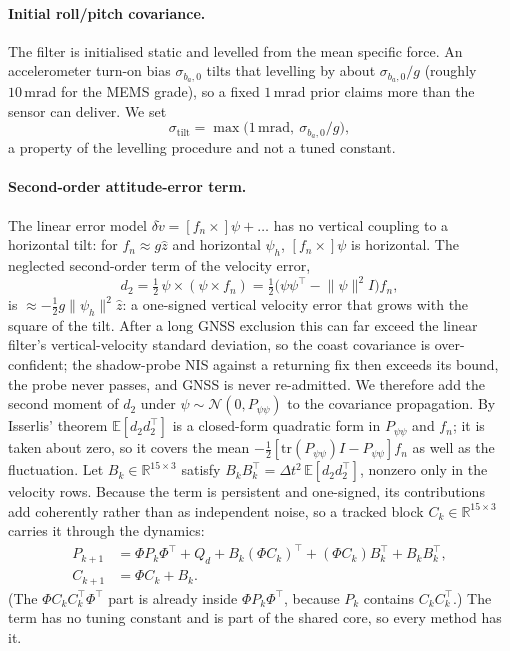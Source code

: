 \documentclass[journal]{IEEEtran}
\begin{document}
\paragraph{Initial roll/pitch covariance.}
The filter is initialised static and levelled from the mean specific force. An accelerometer turn-on bias
$\sigma_{b_a,0}$ tilts that levelling by about $\sigma_{b_a,0}/g$ (roughly $10\,\mathrm{mrad}$ for the MEMS grade), so a fixed
$1\,\mathrm{mrad}$ prior claims more than the sensor can deliver. We set
\begin{equation}
\sigma_{\mathrm{tilt}} = \max\!\big(1\,\mathrm{mrad},\ \sigma_{b_a,0}/g\big),
\label{eq:tilt0}
\end{equation}
a property of the levelling procedure and not a tuned constant.

\paragraph{Second-order attitude-error term.}
The linear error model $\delta\dot v = [f_n\times]\psi + \dots$ has no vertical coupling to a horizontal tilt: for
$f_n \approx g\hat z$ and horizontal $\psi_h$, $[f_n\times]\psi$ is horizontal. The neglected second-order term of the
velocity error,
\begin{equation}
d_2 = \tfrac12\,\psi\times(\psi\times f_n) = \tfrac12\big(\psi\psi^{\top} - \lVert\psi\rVert^2 I\big) f_n,
\label{eq:so}
\end{equation}
is $\approx -\tfrac12 g\lVert\psi_h\rVert^2\hat z$: a one-signed vertical velocity error that grows with the square of the
tilt. After a long GNSS exclusion this can far exceed the linear filter's vertical-velocity standard deviation, so the coast covariance
is over-confident; the shadow-probe NIS against a returning fix then exceeds its bound, the probe never passes, and GNSS is never re-admitted.
We therefore add the second moment of $d_2$ under $\psi\sim\mathcal N(0,P_{\psi\psi})$ to the covariance propagation.
By Isserlis' theorem $\mathbb E[d_2 d_2^{\top}]$ is a closed-form quadratic form in $P_{\psi\psi}$ and $f_n$; it is taken about zero, so it covers the
mean $-\tfrac12[\mathrm{tr}(P_{\psi\psi})I - P_{\psi\psi}]f_n$ as well as the fluctuation. Let $B_k\in\mathbb R^{15\times3}$ satisfy
$B_kB_k^{\top} = \Delta t^2\,\mathbb E[d_2d_2^{\top}]$, nonzero only in the velocity rows. Because the term is persistent and
one-signed, its contributions add coherently rather than as independent noise, so a tracked block $C_k\in\mathbb R^{15\times3}$ carries
it through the dynamics:
\begin{align}
P_{k+1} &= \Phi P_k\Phi^{\top} + Q_{d} + B_k(\Phi C_k)^{\top} + (\Phi C_k)B_k^{\top} + B_kB_k^{\top},\nonumber\\
C_{k+1} &= \Phi C_k + B_k.
\label{eq:sotrack}
\end{align}
(The $\Phi C_kC_k^{\top}\Phi^{\top}$ part is already inside $\Phi P_k\Phi^{\top}$, because $P_k$ contains $C_kC_k^{\top}$.) The term has
no tuning constant and is part of the shared core, so every method has it.
\end{document}
